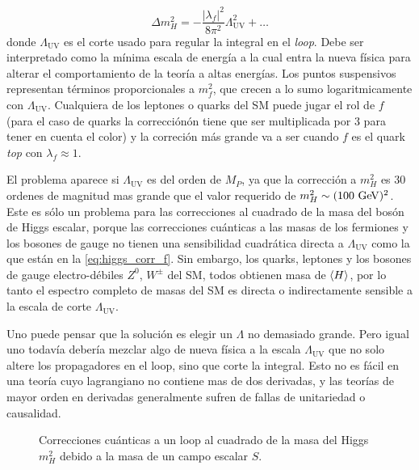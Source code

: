 \begin{equation}
  \Delta m_H^2 = -\frac{|\lambda_f|^2}{8\pi^2} \Lambda^2_\text{UV} +
  \ldots
  \label{eq:higgs_corr_f}
\end{equation}
%
donde $\Lambda_\text{UV}$ es el corte usado para regular la integral
en el \emph{loop}. Debe ser interpretado como la m\'inima escala de
energ\'ia a la cual entra la nueva física para alterar el
comportamiento de la teoría a altas energías. Los puntos suspensivos
representan términos proporcionales a $m_f^2$, que crecen a lo sumo
logaritmicamente con $\Lambda_\text{UV}$. Cualquiera de los leptones o
quarks del SM puede jugar el rol de $f$ (para el caso de quarks la
correcciónón tiene que ser multiplicada por 3 para tener en cuenta el
color) y la correción m\'as grande va a ser cuando $f$ es el quark
\emph{top} con $\lambda_f \approx 1$.

El problema aparece si $\Lambda_\text{UV}$ es del orden de $M_P$, ya
que la corrección a $m_H^2$ es 30 ordenes de magnitud mas grande que
el valor requerido de $m_H^2 \sim (100 \gev)^2$. Este es sólo un
problema para las correcciones al cuadrado de la masa del bosón de
Higgs escalar, porque las correcciones cuánticas a las masas de los
fermiones y los bosones de gauge no tienen una sensibilidad cuadrática
directa a $\Lambda_\text{UV}$ como la que están en la
\cref{eq:higgs_corr_f}. Sin embargo, los quarks, leptones y los
bosones de gauge electro-débiles $Z^0$, $W^{\pm}$ del SM, todos
obtienen masa de $\langle H \rangle$, por lo tanto el espectro completo de masas
del SM es directa o indirectamente sensible a la escala de corte
$\Lambda_\text{UV}$.

Uno puede pensar que la solución es elegir un $\Lambda$ no demasiado
grande. Pero igual uno todavía debería mezclar algo de nueva física a
la escala $\Lambda_\text{UV}$ que no solo altere los propagadores en
el loop, sino que corte la integral. Esto no es fácil en una teoría
cuyo lagrangiano no contiene mas de dos derivadas, y las teorías de
mayor orden en derivadas generalmente sufren de fallas de unitariedad
o causalidad.

\begin{figure}[!htbp]
  \centering 
  \caption{Correcciones cu\'anticas a un loop al cuadrado de la masa
    del Higgs $m_H^2$ debido a la masa de un campo escalar $S$.}
  \label{fig:higgs_correction_s}
\end{figure}

